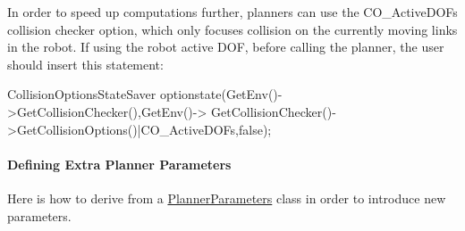In order to speed up computations further, planners can use the CO\_\-ActiveDOFs collision checker option, which only focuses collision on the currently moving links in the robot. If using the robot active DOF, before calling the planner, the user should insert this statement:


\begin{DoxyCode}
CollisionOptionsStateSaver optionstate(GetEnv()->GetCollisionChecker(),GetEnv()->
      GetCollisionChecker()->GetCollisionOptions()|CO_ActiveDOFs,false);
\end{DoxyCode}
\hypertarget{arch__planner_planner_extraparameters}{}\paragraph{Defining Extra Planner Parameters}\label{arch__planner_planner_extraparameters}
Here is how to derive from a \hyperlink{classOpenRAVE_1_1PlannerBase_1_1PlannerParameters}{PlannerParameters} class in order to introduce new parameters.


